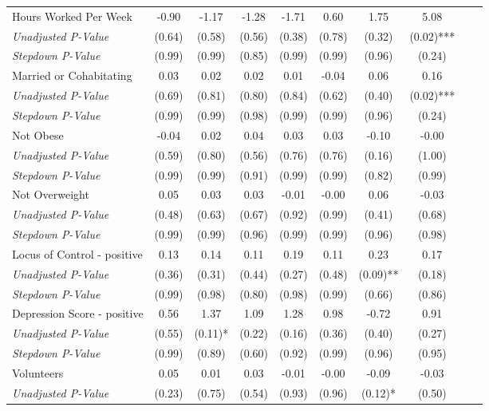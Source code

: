 \begin{tabular}{l c c c c c c c c c}
Hours Worked Per Week & -0.90 & -1.17 & -1.28 & -1.71 & 0.60 & 1.75 & 5.08 \\
\quad \textit{Unadjusted P-Value} & (0.64) & (0.58) & (0.56) & (0.38) & (0.78) & (0.32) & (0.02)*** \\
\quad \textit{Stepdown P-Value} & (0.99) & (0.99) & (0.85) & (0.99) & (0.99) & (0.96) & (0.24) \\
Married or Cohabitating & 0.03 & 0.02 & 0.02 & 0.01 & -0.04 & 0.06 & 0.16 \\
\quad \textit{Unadjusted P-Value} & (0.69) & (0.81) & (0.80) & (0.84) & (0.62) & (0.40) & (0.02)*** \\
\quad \textit{Stepdown P-Value} & (0.99) & (0.99) & (0.98) & (0.99) & (0.99) & (0.96) & (0.24) \\
Not Obese & -0.04 & 0.02 & 0.04 & 0.03 & 0.03 & -0.10 & -0.00 \\
\quad \textit{Unadjusted P-Value} & (0.59) & (0.80) & (0.56) & (0.76) & (0.76) & (0.16) & (1.00) \\
\quad \textit{Stepdown P-Value} & (0.99) & (0.99) & (0.91) & (0.99) & (0.99) & (0.82) & (0.99) \\
Not Overweight & 0.05 & 0.03 & 0.03 & -0.01 & -0.00 & 0.06 & -0.03 \\
\quad \textit{Unadjusted P-Value} & (0.48) & (0.63) & (0.67) & (0.92) & (0.99) & (0.41) & (0.68) \\
\quad \textit{Stepdown P-Value} & (0.99) & (0.99) & (0.96) & (0.99) & (0.99) & (0.96) & (0.98) \\
Locus of Control - positive & 0.13 & 0.14 & 0.11 & 0.19 & 0.11 & 0.23 & 0.17 \\
\quad \textit{Unadjusted P-Value} & (0.36) & (0.31) & (0.44) & (0.27) & (0.48) & (0.09)** & (0.18) \\
\quad \textit{Stepdown P-Value} & (0.99) & (0.98) & (0.80) & (0.98) & (0.99) & (0.66) & (0.86) \\
Depression Score - positive & 0.56 & 1.37 & 1.09 & 1.28 & 0.98 & -0.72 & 0.91 \\
\quad \textit{Unadjusted P-Value} & (0.55) & (0.11)* & (0.22) & (0.16) & (0.36) & (0.40) & (0.27) \\
\quad \textit{Stepdown P-Value} & (0.99) & (0.89) & (0.60) & (0.92) & (0.99) & (0.96) & (0.95) \\
Volunteers & 0.05 & 0.01 & 0.03 & -0.01 & -0.00 & -0.09 & -0.03 \\
\quad \textit{Unadjusted P-Value} & (0.23) & (0.75) & (0.54) & (0.93) & (0.96) & (0.12)* & (0.50) \\

\end{tabular}
